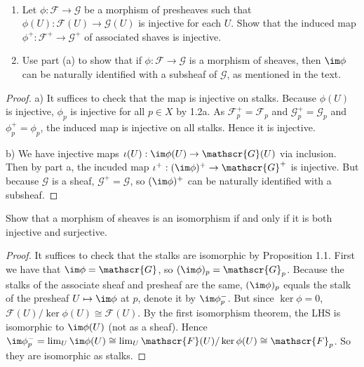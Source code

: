 \begin{exercise}%
	~
	\begin{enumerate}
		\item Let $\phi :\mathscr{F}\to \mathscr{G} $ be a morphism of presheaves such that $\phi (U): \mathscr{F}(U) \to \mathscr{G}(U) $ is injective for each $U $. Show that the induced map $\phi ^+: \mathscr{F}^+ \to \mathscr{G}^+ $ of associated shaves is injective.
		\item Use part (a) to show that if $\phi : \mathscr{F}\to \mathscr{G} $ is a morphism of sheaves, then $\im \phi  $ can be naturally identified with a subsheaf of $\mathscr{G} $, as mentioned in the text.
	\end{enumerate}
\end{exercise}
\begin{proof}
	a) It suffices to check that the map is injective on stalks.
	Because $\phi(U)$ is injective, $\phi_p $ is injective for all $p \in X $ by 1.2a.
	As $\mathscr{F}^+_p = \mathscr{F}_p $ and $\mathscr{G}^+_p = \mathscr{G}_p $ and $\phi^+_p = \phi_p $, the induced map is injective on all stalks.
	Hence it is injective.

	b)
	We have injective maps $\iota (U): \im \phi (U) \to \mathscr{G}(U) $ via inclusion.
	Then by part a, the incuded map $\iota^+: (\im \phi)^+ \to \mathscr{G}^+$ is injective.
	But because $\mathscr{G} $ is a sheaf, $\mathscr{G}^+ = \mathscr{G} $, so $(\im \phi )^+ $ can be naturally identified with a subsheaf.
\end{proof}
%
\begin{exercise}%
	Show that a morphism of sheaves is an isomorphism if and only if it is both injective and surjective.
\end{exercise}
\begin{proof}
	It suffices to check that the stalks are isomorphic by Proposition 1.1.
	First we have that $\im \phi = \mathscr{G} $, so $(\im \phi)_p = \mathscr{G}_p $.
	Because the stalks of the associate sheaf and presheaf are the same, $(\im \phi)_p $ equals the stalk of the presheaf $U\mapsto \im \phi $ at $p $, denote it by $\im \phi^-_p $.
	But since $\ker \phi = 0 $, $\mathscr{F}(U) / \ker \phi(U) \cong \mathscr{F}(U)$.
	By the first isomorphism theorem, the LHS is isomorphic to $\im \phi(U) $ (not as a sheaf).
	Hence $\im\phi^-_p = \lim_{U} \im\phi(U) \cong \lim_U \mathscr{F}(U) / \ker \phi(U) \cong \mathscr{F}_p$.
	So they are isomorphic as stalks.
\end{proof}

